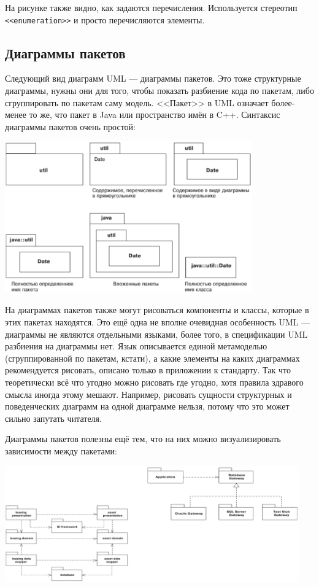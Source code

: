 \documentclass{../text-style}
\begin{document}
На рисунке также видно, как задаются перечисления. Используется стереотип \verb|<<enumeration>>| и просто перечисляются элементы.

\subsection{Диаграммы пакетов}

Следующий вид диаграмм UML --- диаграммы пакетов. Это тоже структурные диаграммы, нужны они для того, чтобы показать разбиение кода по пакетам, либо сгруппировать по пакетам саму модель. <<Пакет>> в UML означает более-менее то же, что пакет в Java или пространство имён в C++. Синтаксис диаграммы пакетов очень простой:

\begin{center}
    \includegraphics[width=0.8\textwidth]{packageDiagrams.png}
\end{center}

На диаграммах пакетов также могут рисоваться компоненты и классы, которые в этих пакетах находятся. Это ещё одна не вполне очевидная особенность UML --- диаграммы не являются отдельными языками, более того, в спецификации UML разбиения на диаграммы нет. Язык описывается единой метамоделью (сгруппированной по пакетам, кстати), а какие элементы на каких диаграммах рекомендуется рисовать, описано только в приложении к стандарту. Так что теоретически всё что угодно можно рисовать где угодно, хотя правила здравого смысла иногда этому мешают. Например, рисовать сущности структурных и поведенческих диаграмм на одной диаграмме нельзя, потому что это может сильно запутать читателя.

Диаграммы пакетов полезны ещё тем, что на них можно визуализировать зависимости между пакетами:

\begin{center}
    \includegraphics[width=0.95\textwidth]{packageDependencies.png}
\end{center}
\end{document}
